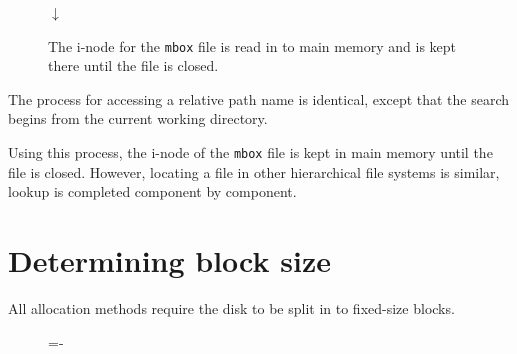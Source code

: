 \documentclass[a4paper]{systems-software}
\begin{document}
\begin{figure}[H]
{\begin{minipage}{\dimexpr \textwidth-2\fboxsep-2\fboxrule}
	\begin{center}
		$\downarrow$
	\end{center}
	
	The i-node for the \texttt{mbox} file is read in to main memory and is kept there until the file is closed. 
  \end{minipage}}
\end{figure}

The process for accessing a relative path name is identical, except that the search begins from the current working directory.

Using this process, the i-node of the \texttt{mbox} file is kept in main memory until the file is closed. However, locating a file in other hierarchical file systems is similar, lookup is completed component by component.


\newpage

\section{Determining block size}

All allocation methods require the disk to be split in to fixed-size blocks.

\begin{figure}[H]
  \lineskip=-\fboxrule
\end{figure}
\end{document}
